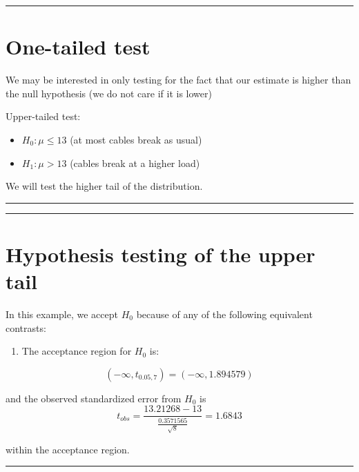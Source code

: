 \documentclass[
]{book}
\providecommand{\tightlist}{%
  \setlength{\itemsep}{0pt}\setlength{\parskip}{0pt}}
\begin{document}
\begin{center}\rule{0.5\linewidth}{0.5pt}\end{center}

\hypertarget{one-tailed-test}{%
\section{One-tailed test}\label{one-tailed-test}}

We may be interested in only testing for the fact that our estimate is higher than the null hypothesis (we do not care if it is lower)

Upper-tailed test:

\begin{itemize}
\tightlist
\item
  \(H_0:\mu \leq 13\) (at most cables break as usual)
\item
  \(H_1:\mu > 13\) (cables break at a higher load)
\end{itemize}

We will test the higher tail of the distribution.

\begin{center}\rule{0.5\linewidth}{0.5pt}\end{center}

\begin{center}\rule{0.5\linewidth}{0.5pt}\end{center}

\hypertarget{hypothesis-testing-of-the-upper-tail}{%
\section{Hypothesis testing of the upper tail}\label{hypothesis-testing-of-the-upper-tail}}

In this example, we accept \(H_0\) because of any of the following equivalent contrasts:

\begin{enumerate}
\def\labelenumi{\arabic{enumi}.}
\tightlist
\item
  The acceptance region for \(H_0\) is:
\end{enumerate}

\[(-\infty, t_{0.05,7})=( -\infty,  1.894579)\]

and the observed standardized error from \(H_0\) is
\[t_{obs} =  \frac{13.21268-13}{\frac{0.3571565}{\sqrt{8}}}=1.6843\]

within the acceptance region.

\begin{center}\rule{0.5\linewidth}{0.5pt}\end{center}
\end{document}
